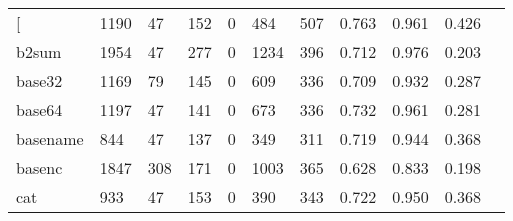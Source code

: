 \begin{longtable}{lp{1.10cm}p{1.10cm}p{1.10cm}p{1.10cm}p{1.10cm}p{1.10cm}p{1.10cm}p{1.10cm}p{1.10cm}p{1.10cm}}
\bottomrule
\endlastfoot
{[}         &                   1190 &                                 47 &                               152 &                                0 &                               484 &                             507 &                             0.763 &                                 0.961 &                               0.426 \\
b2sum     &                   1954 &                                 47 &                               277 &                                0 &                              1234 &                             396 &                             0.712 &                                 0.976 &                               0.203 \\
base32    &                   1169 &                                 79 &                               145 &                                0 &                               609 &                             336 &                             0.709 &                                 0.932 &                               0.287 \\
base64    &                   1197 &                                 47 &                               141 &                                0 &                               673 &                             336 &                             0.732 &                                 0.961 &                               0.281 \\
basename  &                    844 &                                 47 &                               137 &                                0 &                               349 &                             311 &                             0.719 &                                 0.944 &                               0.368 \\
basenc    &                   1847 &                                308 &                               171 &                                0 &                              1003 &                             365 &                             0.628 &                                 0.833 &                               0.198 \\
cat       &                    933 &                                 47 &                               153 &                                0 &                               390 &                             343 &                             0.722 &                                 0.950 &                               0.368 \\

\end{longtable}

